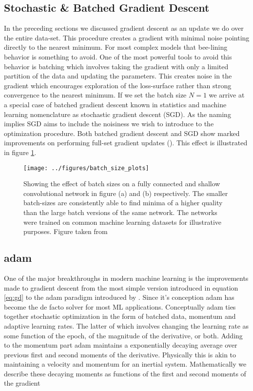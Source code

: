 \subsection{Stochastic \& Batched Gradient Descent}
In the preceding sections we discussed gradient descent as an update we do over the entire data-set. This procedure creates a gradient with minimal noise pointing directly to the nearest minimum. For most complex models that bee-lining behavior is something to avoid. One of the most powerful tools to avoid this behavior is batching which involves taking the gradient with only a limited partition of the data and updating the parameters. This creates noise in the gradient which encourages exploration of the loss-surface rather than strong convergence to the nearest minimum. If we set the batch size $N=1$ we arrive at a special case of batched gradient descent known in statistics and machine learning nomenclature as stochastic gradient descent (SGD). As the naming implies SGD aims to include the noisiness we wish to introduce to the optimization procedure. Both batched gradient descent and SGD show marked improvements on performing full-set gradient updates (\cite{Keskar2016}). This effect is illustrated in figure \ref{fig:batch_size}. 

\begin{figure}[H]
\centering
\texttt{[image: ../figures/batch\_size\_plots]}
\caption[Effect of the batch size on performance]{Showing the effect of batch sizes on a fully connected and shallow convolutional network in figure (a) and (b) respectively. The smaller batch-sizes are consistently able to find minima of a higher quality than the large batch versions of the same network. The networks were trained on common machine learning datasets for illustrative purposes. Figure taken from \citet{Keskar2016} }\label{fig:batch_size}
\end{figure}

\subsection{adam}\label{sec:adam}
One of the major breakthroughs in modern machine learning is the improvements made to gradient descent from the most simple version introduced in equation \ref{eq:gd} to the adam paradigm introduced by \citet{Kingma2015}. Since it's conception adam has become the de facto solver for most ML applications. Conceptually adam ties together stochastic optimization in the form of batched data, momentum and adaptive learning rates. The latter of which involves changing the learning rate as some function of the epoch, of the magnitude of the derivative, or both. Adding to the momentum part adam maintains a exponentially decaying average over previous first and second moments of the derivative. Physically this is akin to maintaining a velocity and momentum for an inertial system. Mathematically we describe these decaying moments as functions of the first and second  moments of the gradient 

